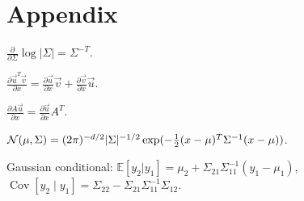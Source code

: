 \section{Appendix}
    
    
    

$\frac{\partial}{\partial \Sigma} \log|\Sigma| = \Sigma^{-T}$.

$\frac{\partial \overrightarrow{u}^T \overrightarrow{v}}{\partial x} = \frac{\partial \overrightarrow{u}}{\partial x} \overrightarrow{v} +\frac{\partial \overrightarrow{v}}{\partial x} \overrightarrow{u}$.

$\frac{\partial A\overrightarrow{u}}{\partial x} = \frac{\partial\overrightarrow{u}}{\partial x} A^T$.


$\mathcal{N}(\mu,\Sigma)=(2\pi)^{-d/2}|\Sigma|^{-1/2}\exp(-\frac{1}{2}(x-\mu)^T \Sigma^{-1} (x-\mu))$.

Gaussian conditional: $\mathbb{E} [y_2 | y_1] = \mu_2+\Sigma_{21}\Sigma_{11}^{-1} (y_1-\mu_1)$, $\operatorname{Cov}[y_2\mid y_1] = \Sigma_{22} - \Sigma_{21}\Sigma_{11}^{-1}\Sigma_{12}$.